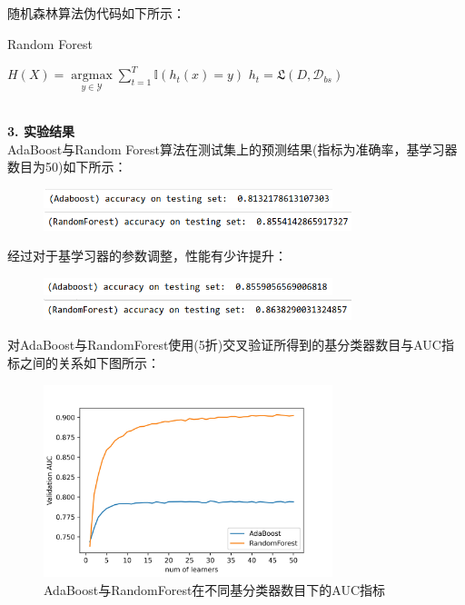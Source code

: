 \documentclass[a4paper,UTF8]{article}
\theoremstyle{definition}
\begin{document}
随机森林算法伪代码如下所示：
 \begin{algorithm}[htbp]
		\caption{ Random Forest }
		\label{alg:alg3}
		\begin{algorithmic}[1] %
		\ENSURE $H(X)=\mathop{\arg\max}\limits_{y\in\mathcal{Y}}\sum_{t=1}^{T}\mathbb{I}(h_t(x)=y)$
			\STATE $h_t=\mathfrak{L}(D,\mathcal{D}_{b s})$
		\ENDFOR		
		\end{algorithmic}
\end{algorithm}
\\[3pt]\textbf{3. 实验结果}\\
AdaBoost与Random Forest算法在测试集上的预测结果(指标为准确率，基学习器数目为50)如下所示：
\begin{figure}[H] %
\centering %
\includegraphics[width=0.75\textwidth]{ada_basetest.png} %
\\[3pt]\includegraphics[width=0.8\textwidth]{rf_basetest.png}
\end{figure}
\noindent 经过对于基学习器的参数调整，性能有少许提升：
\begin{figure}[H] %
\centering %
\includegraphics[width=0.75\textwidth]{ada_test.png} %
\\[3pt]\includegraphics[width=0.8\textwidth]{rf_test.png}
\end{figure}
\noindent 对AdaBoost与RandomForest使用(5折)交叉验证所得到的基分类器数目与AUC指标之间的关系如下图所示：
\begin{figure}[H] %
\label{Fig.4}
\centering %
\includegraphics[width=0.75\textwidth]{stat.jpg} 
\caption{AdaBoost与RandomForest在不同基分类器数目下的AUC指标}
\end{figure}
\end{document}
